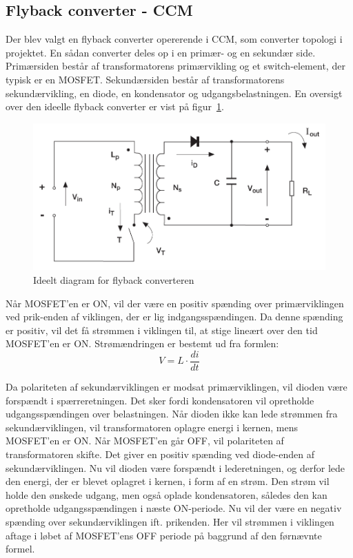
\subsection{Flyback converter - CCM}
Der blev valgt en flyback converter opererende i CCM, som converter topologi i projektet. En sådan converter deles op i en primær- og en sekundær side. Primærsiden består af transformatorens primærvikling og et switch-element, der typisk er en MOSFET. Sekundærsiden består af transformatorens sekundærvikling, en diode, en kondensator og udgangsbelastningen. En oversigt over den ideelle flyback converter er vist på figur~\ref{fig:flyabck_ideal}. 

\begin{figure}[H]
	\centering
	\includegraphics[width=0.7\linewidth]{../Dokumentation/tex/1iteration/billeder/flyback_ideal.png}
	\caption{Ideelt diagram for flyback converteren
		\cite{SMPS-topologies}}
	\label{fig:flyabck_ideal}
\end{figure}

\noindent Når MOSFET'en er ON, vil der være en positiv spænding over primærviklingen ved prik-enden af viklingen, der er lig indgangsspændingen. Da denne spænding er positiv, vil det få strømmen i viklingen til, at stige lineært over den tid MOSFET'en er ON. Strømændringen er bestemt ud fra formlen:
\begin{equation}
V = L \cdot \frac{di}{dt}
\end{equation}

\noindent Da polariteten af sekundærviklingen er modsat primærviklingen, vil dioden være forspændt i spærreretningen. Det sker fordi kondensatoren vil opretholde udgangsspændingen over belastningen. Når dioden ikke kan lede strømmen fra sekundærviklingen, vil transformatoren oplagre energi i kernen, mens MOSFET'en er ON. Når MOSFET'en går OFF, vil polariteten af transformatoren skifte. Det giver en positiv spænding ved diode-enden af sekundærviklingen. Nu vil dioden være forspændt i lederetningen, og derfor lede den energi, der er blevet oplagret i kernen, i form af en strøm. Den strøm vil holde den ønskede udgang, men også oplade kondensatoren, således den kan opretholde udgangsspændingen i næste ON-periode. Nu vil der være en negativ spænding over sekundærviklingen ift. prikenden. Her vil strømmen i viklingen aftage i løbet af MOSFET'ens OFF periode på baggrund af den førnævnte formel. 

